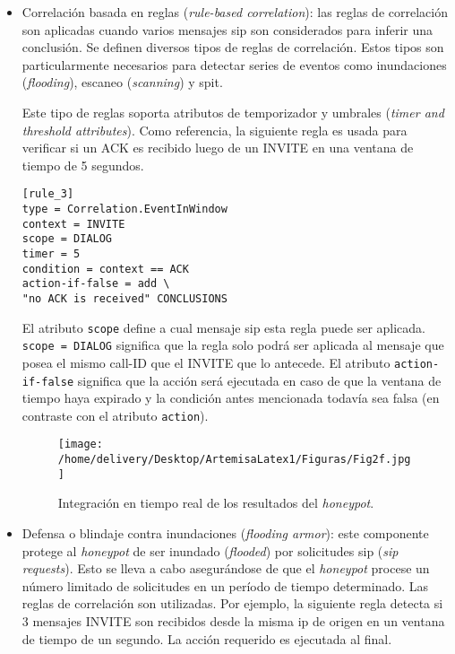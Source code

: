 \documentclass[a4paper,12pt]{report}
\begin{document}
\begin{itemize}
\item Correlación basada en reglas (\emph{rule-based correlation}):
las reglas de correlación son aplicadas cuando varios mensajes \ac{sip} son
considerados para inferir una conclusión. Se definen diversos tipos de reglas
de correlación. Estos tipos son particularmente necesarios para detectar series
de eventos como inundaciones (\emph{flooding}), escaneo (\emph{scanning}) y
\ac{spit}.

Este tipo de reglas soporta atributos de temporizador y umbrales (\emph{timer
and threshold attributes}). Como referencia, la siguiente regla es usada para
verificar si un ACK es recibido luego de un INVITE en una ventana de tiempo de
5 segundos. 

\begin{verbatim}
[rule_3]                         
type = Correlation.EventInWindow
context = INVITE
scope = DIALOG
timer = 5
condition = context == ACK       
action-if-false = add \          
"no ACK is received" CONCLUSIONS
\end{verbatim}


El atributo \texttt{scope} define a cual mensaje \ac{sip} esta regla puede ser
aplicada. \texttt{scope = DIALOG} significa que la regla solo podrá ser
aplicada al mensaje que posea el mismo call-ID que el INVITE que lo antecede.
El atributo \texttt{action-if-false} significa que la acción será ejecutada en
caso de que la ventana de tiempo haya expirado y la condición antes mencionada
todavía sea falsa (en contraste con el atributo \texttt{action}). 

\begin{figure}[h!] 
\centering
\texttt{[image: /home/delivery/Desktop/ArtemisaLatex1/Figuras/Fig2f.jpg]}
\caption{Integración en tiempo real de los resultados del \emph{honeypot}. \cite{docarmof}}
\label{diagrama_integracion_honeypot}
\end{figure}

\item Defensa o blindaje contra inundaciones (\emph{flooding armor}):
este componente protege al \emph{honeypot} de ser inundado (\emph{flooded}) por
solicitudes \ac{sip} (\emph{\ac{sip} requests}). Esto se lleva a cabo asegurándose de que
el \emph{honeypot} procese un número limitado de solicitudes en un período de tiempo
determinado. Las reglas de correlación son utilizadas. Por ejemplo, la
siguiente regla detecta si 3 mensajes INVITE son recibidos desde la misma \ac{ip} de
origen en un ventana de tiempo de un segundo. La acción requerido es ejecutada
al final.  


\end{itemize}
\end{document}
